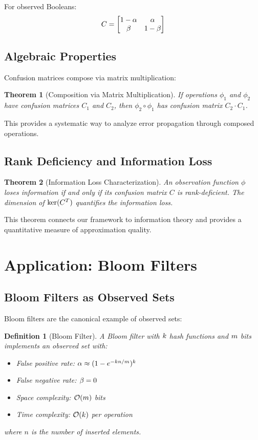\documentclass[11pt]{article}
\newtheorem{definition}{Definition}
\newtheorem{theorem}{Theorem}
\begin{document}
For observed Booleans:
$$C = \begin{bmatrix}
1-\alpha & \alpha \\
\beta & 1-\beta
\end{bmatrix}$$

\subsection{Algebraic Properties}

Confusion matrices compose via matrix multiplication:

\begin{theorem}[Composition via Matrix Multiplication]
If operations $\phi_1$ and $\phi_2$ have confusion matrices $C_1$ and $C_2$, then $\phi_2 \circ \phi_1$ has confusion matrix $C_2 \cdot C_1$.
\end{theorem}

This provides a systematic way to analyze error propagation through composed operations.

\subsection{Rank Deficiency and Information Loss}

\begin{theorem}[Information Loss Characterization]
An observation function $\phi$ loses information if and only if its confusion matrix $C$ is rank-deficient. The dimension of $\text{ker}(C^T)$ quantifies the information loss.
\end{theorem}

This theorem connects our framework to information theory and provides a quantitative measure of approximation quality.

\section{Application: Bloom Filters}

\subsection{Bloom Filters as Observed Sets}

Bloom filters are the canonical example of observed sets:

\begin{definition}[Bloom Filter]
A Bloom filter with $k$ hash functions and $m$ bits implements an observed set with:
\begin{itemize}
\item False positive rate: $\alpha \approx (1-e^{-k n/m})^{k}$
\item False negative rate: $\beta = 0$
\item Space complexity: $\mathcal{O}(m)$ bits
\item Time complexity: $\mathcal{O}(k)$ per operation
\end{itemize}
where $n$ is the number of inserted elements.
\end{definition}
\end{document}
